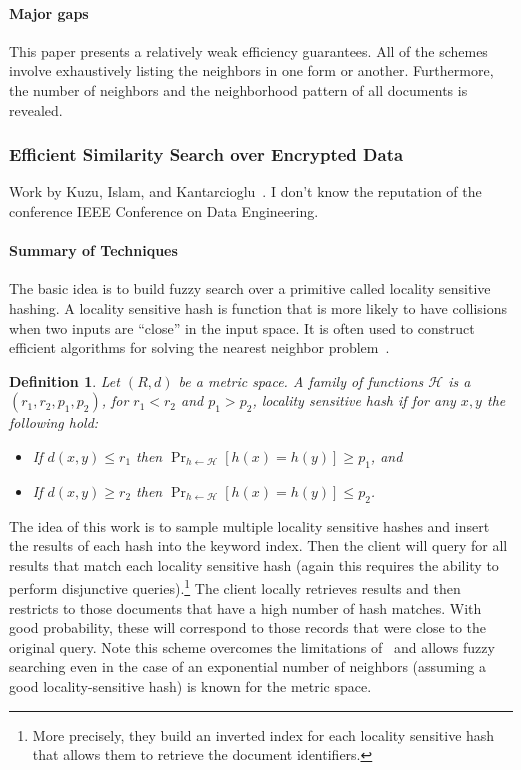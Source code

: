 \documentclass[11pt]{article}
\newtheorem{definition}{Definition}[section]
\theoremstyle{remark}
\begin{document}
\paragraph{Major gaps}
This paper presents a relatively weak efficiency guarantees.  All of the schemes involve exhaustively listing the neighbors in one form or another.  Furthermore, the number of neighbors and the neighborhood pattern of all documents is revealed.

\subsubsection{Efficient Similarity Search over Encrypted Data}
Work by Kuzu, Islam, and Kantarcioglu~\cite{kuzu2012efficient}.  I don't know the reputation of the conference IEEE Conference on Data Engineering.  

\paragraph{Summary of Techniques} The basic idea is to build fuzzy search over a primitive called locality sensitive hashing.  A locality sensitive hash is function that is more likely to have collisions when two inputs are ``close'' in the input space.  It is often used to construct efficient algorithms for solving the nearest neighbor problem~\cite{datar2004locality,slaney2008locality}.  

\begin{definition}
Let $(R,d)$ be a metric space.  A family of functions $\mathcal{H}$ is a $(r_1, r_2, p_1, p_2)$, for $r_1< r_2$ and $p_1 >p_2$, locality sensitive hash if for any $x, y$ the following hold:
\begin{itemize}
\item If $d(x, y) \le r_1$ then $\Pr_{h\leftarrow \mathcal{H}}[h(x) = h(y)] \ge p_1$, and 
\item If $d(x, y) \ge r_2$ then $\Pr_{h\leftarrow \mathcal{H}}[h(x) = h(y)] \le p_2$.
\end{itemize}
\end{definition}

The idea of this work is to sample multiple locality sensitive hashes and insert the results of each hash into the keyword index.  Then the client will query for all results that match each locality sensitive hash (again this requires the ability to perform disjunctive queries).\footnote{More precisely, they build an inverted index for each locality sensitive hash that allows them to retrieve the document identifiers.}  The client locally retrieves results and then restricts to those documents that have a high number of hash matches.  With good probability, these will correspond to those records that were close to the original query.  Note this scheme overcomes the limitations of~\cite{li2010fuzzy} and allows fuzzy searching even in the case of an exponential number of neighbors (assuming a good locality-sensitive hash) is known for the metric space.
\end{document}
